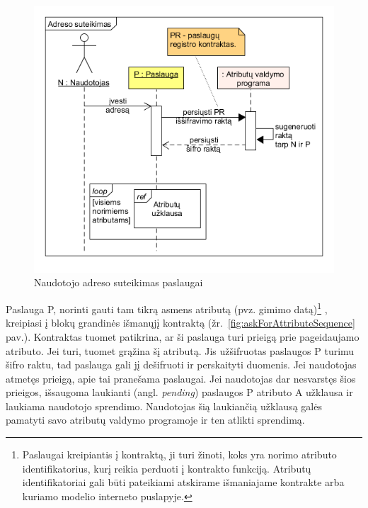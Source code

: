 \begin{figure}[H]
    \centering
    \includegraphics[scale=0.6]{img/userGivesAddress}
    \caption{Naudotojo adreso suteikimas paslaugai}
    \label{fig:userGivesAddress}
\end{figure}


Paslauga P, norinti gauti tam tikrą asmens atributą (pvz. gimimo datą)\footnote{ Paslaugai kreipiantis į kontraktą, ji turi žinoti, koks yra norimo atributo identifikatorius, kurį reikia perduoti į kontrakto funkciją. 
Atributų identifikatoriai gali būti pateikiami atskirame išmaniajame kontrakte arba kuriamo modelio interneto puslapyje.}
, kreipiasi į blokų grandinės išmanųjį kontraktą (žr.\hypertarget{fig:askForAttributeSequence}{~\ref{fig:askForAttributeSequence} pav.}).
Kontraktas tuomet patikrina, ar ši paslauga turi prieigą prie pageidaujamo atributo. Jei turi, tuomet grąžina šį atributą. Jis
užšifruotas paslaugos P turimu šifro raktu, tad paslauga gali jį dešifruoti ir perskaityti duomenis. Jei
naudotojas atmetęs prieigą, apie tai pranešama paslaugai. Jei naudotojas dar nesvarstęs šios prieigos, išsaugoma laukianti
(angl. \textit{pending}) paslaugos P atributo A užklausa ir laukiama naudotojo sprendimo. Naudotojas šią laukiančią užklausą galės pamatyti savo 
atributų valdymo programoje ir ten atlikti sprendimą.


